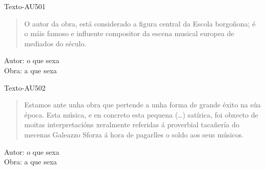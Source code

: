 %
% 
%
%
\begin{defproblem}{Texto-AU501}
\begin{quotation}
\small{
O autor da obra, está considerado a figura central da Escola borgoñona; é o
máis famoso e influente compositor da escena musical europea de mediados do
século.

}
\end{quotation}

\begin{onlysolution}
    \begin{solution}
Autor: o que sexa\\
Obra: a que sexa\\
    \end{solution}
\end{onlysolution}

\end{defproblem}
%
%
%
%
\begin{defproblem}{Texto-AU502}
\begin{quotation}
\small{
Estamos ante unha obra que pertende a unha forma de grande éxito na súa época.
Esta música, e en concreto esta pequena (\ldots) satírica, foi obxecto de
moitas interpretacións xeralmente referidas á proverbial tacañería do mecenas
Galeazzo Sforza á hora de pagarlles o soldo aos seus músicos.
}
\end{quotation}

\begin{onlysolution}
    \begin{solution}
Autor: o que sexa\\
Obra: a que sexa\\
    \end{solution}
\end{onlysolution}

\end{defproblem}
%
%
